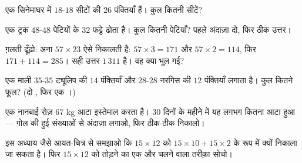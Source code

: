 \begin{exercise}[$\star$]\label{exo:g4:mult:6}
एक सिनेमाघर में $18$-$18$ सीटों की $26$ पंक्तियाँ हैं। कुल कितनी सीटें?
\end{exercise}

\begin{exercise}[$\star$]\label{exo:g4:mult:7}
एक ट्रक $48$-$48$ पेटियों के $32$ फट्टे ढोता है। कुल कितनी
पेटियाँ? पहले अंदाज़ा दो, फिर ठीक उत्तर।
\end{exercise}

\begin{exercise}[$\star$]\label{exo:g4:mult:8}
ग़लती ढूँढ़ो: अना $57 \times 23$ ऐसे निकालती है:
$57 \times 3 = 171$ और $57 \times 2 = 114$, फिर
$171 + 114 = 285$। सही उत्तर $1\,311$ है। वह क्या भूल
गई?
\end{exercise}

\begin{exercise}[$\star\star$]\label{exo:g4:mult:9}
एक माली $35$-$35$ ट्यूलिप की $14$ पंक्तियाँ और $28$-$28$ नरगिस
की $12$ पंक्तियाँ लगाता है। कुल कितने फूल? (दो , फिर एक ।)
\end{exercise}

\begin{exercise}[$\star\star$]\label{exo:g4:mult:10}
एक नानबाई रोज़ $67$ kg आटा इस्तेमाल करता है। $30$ दिनों के
महीने में यह लगभग कितना आटा हुआ --- गोल की हुई संख्याओं से
अंदाज़ा लगाओ, फिर ठीक-ठीक निकालो।
\end{exercise}

\begin{exercise}[$\star\star$]\label{exo:g4:mult:11}
इस अध्याय जैसे आयत-चित्र से समझाओ कि $15 \times 12$ को
$15 \times 10 + 15 \times 2$ के रूप में क्यों निकाला जा सकता है।
फिर $15 \times 12$ को तोड़ने का एक और चलने वाला तरीक़ा सोचो।
\end{exercise}
